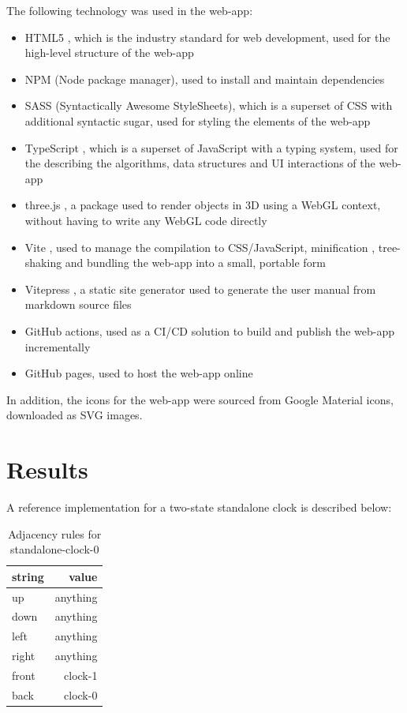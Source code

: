 \documentclass[letterpaper,11pt]{article}
\begin{document}
The following technology was used in the web-app:

\begin{itemize}
	\item HTML5 \cite{HTML5}, which is the industry standard for web development, used for the high-level structure of the web-app
	\item NPM \cite{npm} (Node package manager), used to install and maintain dependencies
	\item SASS \cite{sass} (Syntactically Awesome StyleSheets), which is a superset of CSS with additional syntactic sugar, used for styling the elements of the web-app
	\item TypeScript \cite{typescript}, which is a superset of JavaScript with a typing system, used for the describing the algorithms, data structures and UI interactions of the web-app
	\item three.js \cite{3js}, a package used to render objects in 3D using a WebGL context, without having to write any WebGL code directly
	\item Vite \cite{vite}, used to manage the compilation to CSS/JavaScript, minification \cite{minification}, tree-shaking \cite{tree} and bundling the web-app into a small, portable form
	\item Vitepress \cite{vitepress}, a static site generator \cite{ssg} used to generate the user manual from markdown \cite{markdown} source files
	\item GitHub actions, used as a CI/CD solution to build and publish the web-app incrementally
	\item GitHub pages, used to host the web-app online
\end{itemize}

In addition, the icons for the web-app were sourced from Google Material \cite{google-material} icons, downloaded as SVG images.


\section*{Results}

A reference implementation for a two-state standalone clock is described below:

\begin{table}[h!tbp]
	\centering
	\caption{Adjacency rules for standalone-clock-0}
	{\footnotesize %
	\begin{tabular}{|l|r|}
	\hline
	  string & value \\
	\hline
	up & anything \\
	\hline
	down & anything \\
	\hline
	left & anything \\
	\hline
	right & anything \\
	\hline
	front & clock-1 \\
	\hline
	back & clock-0 \\
	\hline
	\end{tabular}
	}
	\end{table}
\end{document}
